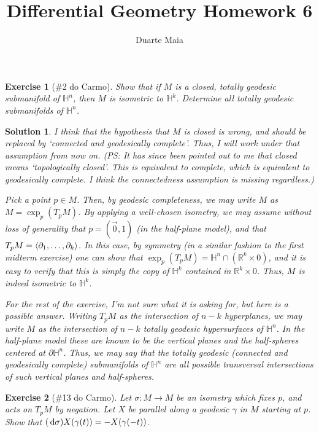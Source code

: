 \documentclass{article}
\title{Differential Geometry Homework 6}
\author{Duarte Maia}
\theoremstyle{plain}
\newtheorem*{ex}{Exercise}
\theoremstyle{nonumberplain}
\newtheorem{sol}{Solution}
\newcommand{\R}{\mathbb{R}}
\newcommand{\HH}{\mathbb{H}}
\DeclarePairedDelimiter{\braket}{\langle}{\rangle}
\begin{document}
\maketitle

\begin{ex}[\#2 do Carmo]
Show that if $M$ is a closed, totally geodesic submanifold of $\HH^n$, then $M$ is isometric to $\HH^k$. Determine all totally geodesic submanifolds of $\HH^n$.
\end{ex}

\begin{sol}
I think that the hypothesis that $M$ is closed is wrong, and should be replaced by `connected and geodesically complete'. Thus, I will work under that assumption from now on. (PS: It has since been pointed out to me that closed means `topologically closed'. This is equivalent to complete, which is equivalent to geodesically complete. I think the connectedness assumption is missing regardless.)

Pick a point $p \in M$. Then, by geodesic completeness, we may write $M$ as $M = \exp_p(T_pM)$. By applying a well-chosen isometry, we may assume without loss of generality that $p = (\vec 0, 1)$ (in the half-plane model), and that $T_p M = \braket{\partial_1, \dots, \partial_k}$. In this case, by symmetry (in a similar fashion to the first midterm exercise) one can show that $\exp_p(T_pM) = \HH^n \cap (\R^k \times 0)$, and it is easy to verify that this is simply the copy of $\HH^k$ contained in $\R^k \times 0$. Thus, $M$ is indeed isometric to $\HH^k$.

For the rest of the exercise, I'm not sure what it is asking for, but here is a possible answer. Writing $T_p M$ as the intersection of $n-k$ hyperplanes, we may write $M$ as the intersection of $n-k$ totally geodesic hypersurfaces of $\HH^n$. In the half-plane model these are known to be the vertical planes and the half-spheres centered at $\partial\HH^n$. Thus, we may say that the totally geodesic (connected and geodesically complete) submanifolds of $\HH^n$ are all possible transversal intersections of such vertical planes and half-spheres.
\end{sol}

\begin{ex}[\#13 do Carmo]
Let $\sigma \colon M \to M$ be an isometry which fixes $p$, and acts on $T_p M$ by negation. Let $X$ be parallel along a geodesic $\gamma$ in $M$ starting at $p$. Show that $(\dl \sigma)X(\gamma(t)) = -X(\gamma(-t))$.
\end{ex}
\end{document}

